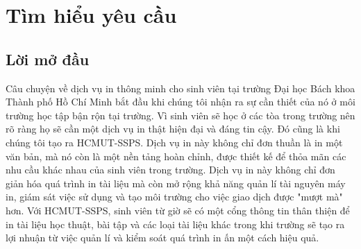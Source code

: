 \documentclass[a4paper]{article}
\begin{document}
\section{Tìm hiểu yêu cầu}
\subsection{Lời mở đầu}
Câu chuyện về dịch vụ in thông minh cho sinh viên tại trường Đại học Bách khoa Thành phố Hồ Chí Minh bắt đầu khi chúng tôi nhận ra sự cần thiết của nó ở môi trường học tập bận rộn tại trường. Vì sinh viên sẽ học ở các tòa trong trường nên rõ ràng họ sẽ cần một dịch vụ in thật hiện đại và đáng tin cậy. Đó cũng là khi chúng tôi tạo ra HCMUT-SSPS. Dịch vụ in này không chỉ đơn thuần là in một văn bản, mà nó còn là một nền tảng hoàn chỉnh, được thiết kế để thỏa mãn các nhu cầu khác nhau của sinh viên trong trường. Dịch vụ in này không chỉ đơn giản hóa quá trình in tài liệu mà còn mở rộng khả năng quản lí tài nguyên máy in, giám sát việc sử dụng và tạo môi trường cho việc giao dịch được "mượt mà" hơn. Với HCMUT-SSPS, sinh viên từ giờ sẽ có một cổng thông tin thân thiện để in tài liệu học thuật, bài tập và các loại tài liệu khác trong khi trường sẽ tạo ra lợi nhuận từ việc quản lí và kiểm soát quá trình in ấn một cách hiệu quả.
\end{document}
